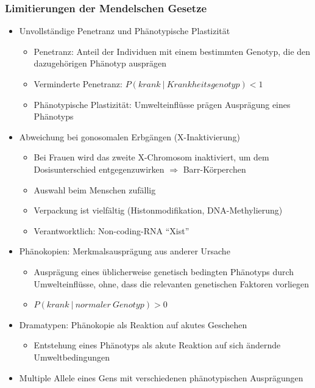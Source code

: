 \subsubsection{Limitierungen der Mendelschen Gesetze}
\begin{itemize}
    \item Unvollständige Penetranz und Phänotypische Plastizität
        \begin{itemize}
            \item Penetranz: Anteil der Individuen mit einem bestimmten Genotyp, die den dazugehörigen Phänotyp ausprägen
            \item Verminderte Penetranz: $P(krank~|~Krankheitsgenotyp) < 1$
            \item Phänotypische Plastizität: Umwelteinflüsse prägen Ausprägung eines Phänotyps
        \end{itemize}
    \item Abweichung bei gonosomalen Erbgängen (X-Inaktivierung)
        \begin{itemize}
            \item Bei Frauen wird das zweite X-Chromosom inaktiviert, um dem Dosisunterschied entgegenzuwirken $\Rightarrow$ Barr-Körperchen
            \item Auswahl beim Menschen zufällig
            \item Verpackung ist vielfältig (Histonmodifikation, DNA-Methylierung)
            \item Verantworktlich: Non-coding-RNA ``Xist''
        \end{itemize}
    \item Phänokopien: Merkmalsausprägung aus anderer Ursache
        \begin{itemize}
            \item Ausprägung eines üblicherweise genetisch bedingten Phänotyps durch Umwelteinflüsse, ohne, dass die relevanten genetischen Faktoren vorliegen
            \item $P(krank~|~normaler~Genotyp) > 0$
        \end{itemize}
    \item Dramatypen: Phänokopie als Reaktion auf akutes Geschehen
        \begin{itemize}
            \item Entstehung eines Phänotyps als akute Reaktion auf sich ändernde Umweltbedingungen
        \end{itemize}
    \item Multiple Allele eines Gens mit verschiedenen phänotypischen Ausprägungen

\end{itemize}
